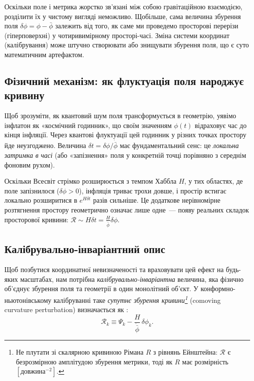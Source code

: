 Оскільки поле і метрика жорстко зв'язані між собою гравітаційною взаємодією, розділити
їх у чистому вигляді неможливо. Щобільше, сама величина збурення поля $\delta\phi = \phi - \bar\phi$
залежить від того, як саме ми проведемо просторові перерізи (гіперповерхні) у чотиривимірному
просторі-часі. Зміна системи координат (калібрування) може штучно створювати або знищувати
збурення поля, що є суто математичним артефактом.

\subsection*{Фізичний механізм: як флуктуація поля народжує кривину}

Щоб зрозуміти, як квантовий шум поля трансформується в геометрію, уявімо інфлатон як «космічний годинник»,
що своїм значенням $\phi(t)$ відраховує час до кінця інфляції. Через квантові флуктуації
цей годинник у різних точках простору йде неузгоджено. Величина $\delta t = \delta\phi / \dot{\bar\phi}$
має фундаментальний сенс: це \emph{локальна затримка в часі} (або «запізнення» поля у конкретній точці
порівняно з середнім фоновим рухом).

Оскільки Всесвіт стрімко розширюється з темпом Хаббла $H$, у тих областях, де поле запізнилося ($\delta\phi > 0$),
інфляція триває трохи довше, і простір встигає локально розширитися в $e^{H \delta t}$ разів сильніше.
Це додаткове нерівномірне розтягнення простору геометрично означає лише одне~--- появу реальних
складок просторової кривини: $\mathcal{R} \sim H \delta t = \frac{H}{\dot{\bar\phi}}\delta\phi$.

\subsection*{Калібрувально-інваріантний опис}

Щоб позбутися координатної невизначеності та враховувати цей ефект на будь-яких масштабах,
нам потрібна \emph{калібрувально-інваріантна} величина, яка фізично об'єднує збурення поля та геометрії
в один монолітний об'єкт. У конформно-ньютонівському калібруванні таке \emph{супутнє збурення кривини\footnote{Не плутати зі скалярною кривиною Рімана $R$
з рівнянь Ейнштейна: $\mathcal{R}$ є безрозмірною амплітудою
збурення метрики, тоді як $R$ має розмірність
$[\text{довжина}^{-2}]$.}}
(comoving curvature perturbation) визначається як \cite{bardeen_1980}:
\begin{equation}\label{eq:R_definition}
  \mathcal{R}_k \equiv \Psi_k - \frac{H}{\dot{\bar\phi}}\,\delta\phi_k.
\end{equation}%

